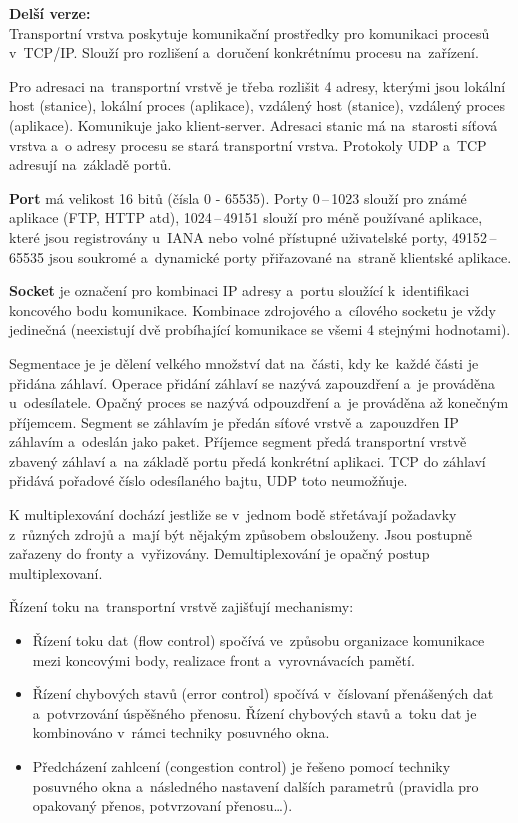 \textbf{Delší verze:}\\
Transportní vrstva poskytuje komunikační prostředky pro komunikaci procesů v~TCP/IP. Slouží pro rozlišení a~doručení konkrétnímu procesu na~zařízení.

Pro adresaci na~transportní vrstvě je třeba rozlišit 4 adresy, kterými jsou lokální host (stanice), lokální proces (aplikace), vzdálený host (stanice), vzdálený proces (aplikace). Komunikuje jako klient-server. Adresaci stanic má na~starosti síťová vrstva a~o adresy procesu se stará transportní vrstva. Protokoly UDP a~TCP adresují na~základě portů.

\textbf{Port} má velikost 16 bitů (čísla 0 - 65535). Porty 0\,--\,1023 slouží pro známé aplikace (FTP, HTTP atd), 1024\,--\,49151 slouží pro méně používané aplikace, které jsou registrovány u~IANA nebo volné přístupné uživatelské porty, 49152\,--\,65535 jsou soukromé a~dynamické porty přiřazované na~straně klientské aplikace.

\textbf{Socket} je označení pro kombinaci IP adresy a~portu sloužící k~identifikaci koncového bodu komunikace. Kombinace zdrojového a~cílového socketu je vždy jedinečná (neexistují dvě probíhající komunikace se všemi 4 stejnými hodnotami).

Segmentace je je dělení velkého množství dat na~části, kdy ke~každé části je přidána záhlaví. Operace přidání záhlaví se nazývá zapouzdření a~je prováděna u~odesílatele. Opačný proces se nazývá odpouzdření a~je prováděna až konečným příjemcem. Segment se záhlavím je předán síťové vrstvě a~zapouzdřen IP záhlavím a~odeslán jako paket. Příjemce segment předá transportní vrstvě zbavený záhlaví a~na základě portu předá konkrétní aplikaci. TCP do záhlaví přidává pořadové číslo odesílaného bajtu, UDP toto neumožňuje.

K multiplexování dochází jestliže se v~jednom bodě střetávají požadavky z~různých zdrojů a~mají být nějakým způsobem obslouženy. Jsou postupně zařazeny do fronty a~vyřizovány. Demultiplexování je opačný postup multiplexovaní.

Řízení toku na~transportní vrstvě zajišťují mechanismy:
\begin{itemize}[noitemsep]
    \item Řízení toku dat (flow control) spočívá ve~způsobu organizace komunikace mezi koncovými body, realizace front a~vyrovnávacích pamětí.
    \item Řízení chybových stavů (error control) spočívá v~číslovaní  přenášených dat a~potvrzování úspěšného přenosu. Řízení chybových stavů a~toku dat je kombinováno v~rámci techniky posuvného okna.
    \item Předcházení zahlcení (congestion control) je řešeno pomocí techniky posuvného okna a~následného nastavení dalších parametrů (pravidla pro opakovaný přenos, potvrzovaní přenosu\dots).
\end{itemize}

